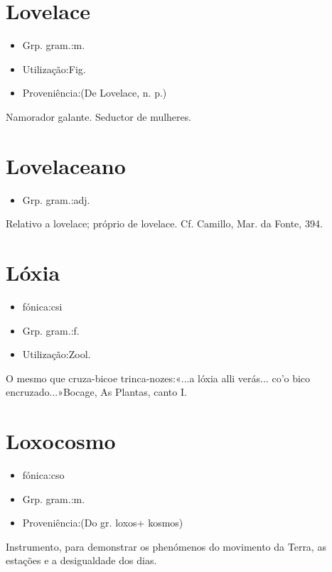 \section{Lovelace}
\begin{itemize}
\item {Grp. gram.:m.}
\end{itemize}
\begin{itemize}
\item {Utilização:Fig.}
\end{itemize}
\begin{itemize}
\item {Proveniência:(De \textunderscore Lovelace\textunderscore , n. p.)}
\end{itemize}
Namorador galante.
Seductor de mulheres.
\section{Lovelaceano}
\begin{itemize}
\item {Grp. gram.:adj.}
\end{itemize}
Relativo a lovelace; próprio de lovelace. Cf. Camillo, \textunderscore Mar. da Fonte\textunderscore , 394.
\section{Lóxia}
\begin{itemize}
\item {fónica:csi}
\end{itemize}
\begin{itemize}
\item {Grp. gram.:f.}
\end{itemize}
\begin{itemize}
\item {Utilização:Zool.}
\end{itemize}
O mesmo que \textunderscore cruza-bico\textunderscore  e \textunderscore trinca-nozes\textunderscore :«\textunderscore ...a lóxia alli verás... co'o bico encruzado...\textunderscore »Bocage, \textunderscore As Plantas\textunderscore , canto I.
\section{Loxocosmo}
\begin{itemize}
\item {fónica:cso}
\end{itemize}
\begin{itemize}
\item {Grp. gram.:m.}
\end{itemize}
\begin{itemize}
\item {Proveniência:(Do gr. \textunderscore loxos\textunderscore  + \textunderscore kosmos\textunderscore )}
\end{itemize}
Instrumento, para demonstrar os phenómenos do movimento da Terra, as estações e a desigualdade dos dias.
